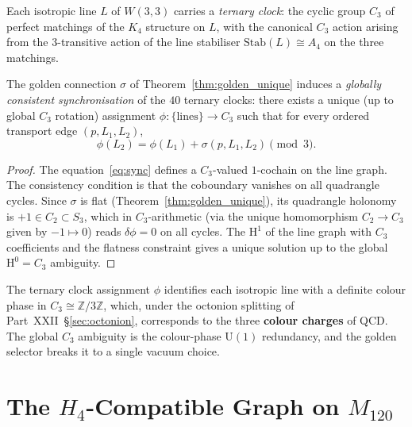 \begin{definition}
\label{def:ternary_clock}
Each isotropic line $L$ of $W(3,3)$ carries a \emph{ternary clock}:
the cyclic group $C_3$ of perfect matchings of the $K_4$ structure
on $L$, with the canonical $C_3$ action arising from the
$3$-transitive action of the line stabiliser $\mathrm{Stab}(L)\cong
A_4$ on the three matchings.
\end{definition}

\begin{theorem}
\label{thm:sync}
The golden connection $\sigma$ of Theorem~\ref{thm:golden_unique}
induces a \emph{globally consistent synchronisation} of the $40$
ternary clocks: there exists a unique (up to global $C_3$ rotation)
assignment $\phi: \{\text{lines}\}\to C_3$ such that for every
ordered transport edge $(p,L_1,L_2)$,
\begin{equation}
  \phi(L_2) = \phi(L_1) + \sigma(p,L_1,L_2) \pmod{3}.
  \label{eq:sync}
\end{equation}
\end{theorem}

\begin{proof}
The equation~\eqref{eq:sync} defines a $C_3$-valued $1$-cochain on the
line graph.  The consistency condition is that the coboundary vanishes
on all quadrangle cycles.  Since $\sigma$ is flat (Theorem~\ref{thm:golden_unique}),
its quadrangle holonomy is $+1\in C_2\subset S_3$, which in
$C_3$-arithmetic (via the unique homomorphism $C_2\to C_3$ given
by $-1\mapsto 0$) reads $\delta\phi=0$ on all cycles.  The
$\mathrm{H}^1$ of the line graph with $C_3$ coefficients and the
flatness constraint gives a unique solution up to the global
$\mathrm{H}^0=C_3$ ambiguity.
\qedhere
\end{proof}

\begin{corollary}
\label{cor:sync_phys}
The ternary clock assignment $\phi$ identifies each isotropic line
with a definite colour phase in $C_3\cong\mathbb{Z}/3\mathbb{Z}$,
which, under the octonion splitting of Part~XXII~\S\ref{sec:octonion},
corresponds to the three \textbf{colour charges} of QCD.
The global $C_3$ ambiguity is the colour-phase $\mathrm{U}(1)$
redundancy, and the golden selector breaks it to a single vacuum
choice.
\end{corollary}

\section{\texorpdfstring{The $H_4$-Compatible Graph on $M_{120}$}{The H4-Compatible Graph on M120}}
\label{sec:h4_graph}

